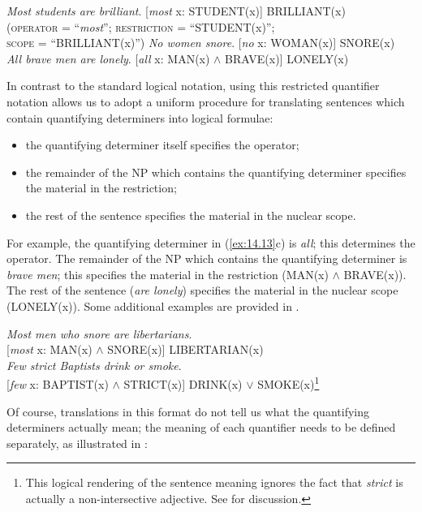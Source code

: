 \ea \label{ex:14.13}
\ea \textit{Most students are brilliant}.  [\textit{most} x: STUDENT(x)] BRILLIANT(x)\\
\hspace{35pt}\textsc{(operator} = “\textit{most}”; \textsc{restriction} = “STUDENT(x)”;\\
\hspace{40pt}\textsc{scope} = “BRILLIANT(x)”)
\ex  \textit{No women snore}.  [\textit{no} x: WOMAN(x)] SNORE(x)\\
\ex \textit{All brave men are lonely}.  [\textit{all} x: MAN(x) $\wedge$ BRAVE(x)] LONELY(x)
\z \z


In contrast to the standard logical notation, using this restricted quantifier notation allows us to adopt a uniform procedure for translating sentences which contain quantifying determiners into logical formulae:


\begin{itemize}
\item the quantifying determiner itself specifies the operator;
\item the remainder of the NP which contains the quantifying determiner specifies the material in the restriction;
\item the rest of the sentence specifies the material in the nuclear scope.
\end{itemize}

For example, the quantifying determiner in (\ref{ex:14.13}c) is \textit{all}; this determines the operator. The remainder of the NP which contains the quantifying determiner is \textit{brave men}; this specifies the material in the restriction (MAN(x) $\wedge$ BRAVE(x)). The rest of the sentence (\textit{are lonely}) specifies the material in the nuclear scope (LONELY(x)). Some additional examples are provided in .


\ea \label{ex:14.14}
\ea  \textit{Most men who snore are libertarians}.\\
  {}[\textit{most} x: MAN(x) $\wedge$ SNORE(x)] LIBERTARIAN(x)\\
\ex \textit{Few strict Baptists drink or smoke}.\\
  {}[\textit{few} x: BAPTIST(x) $\wedge$ STRICT(x)] DRINK(x) $\vee$ SMOKE(x)\footnote{This logical rendering of the sentence meaning ignores the fact that \textit{strict} is actually a non-intersective adjective. See  for discussion.}
                       \z
\z


Of course, translations in this format do not tell us what the quantifying determiners actually mean; the meaning of each quantifier needs to be defined separately, as illustrated in :


